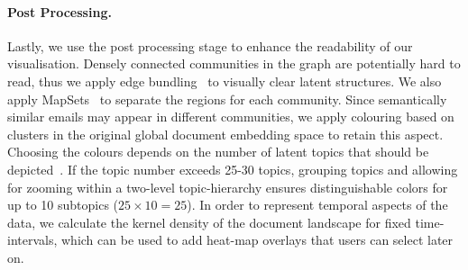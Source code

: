 \paragraph{Post Processing.}
Lastly, we use the post processing stage to enhance the readability of our visualisation.
Densely connected communities in the graph are potentially hard to read, thus we apply edge bundling~\cite{bach2017towards} to visually clear latent structures.
We also apply MapSets~\cite{efrat2015mapsets} to separate the regions for each community.
Since semantically similar emails may appear in different communities, we apply colouring based on clusters in the original global document embedding space to retain this aspect.
Choosing the colours depends on the number of latent topics that should be depicted~\cite{zeileis2009escaping}.
If the topic number exceeds 25-30 topics, grouping topics and allowing for zooming within a two-level topic-hierarchy ensures distinguishable colors for up to 10 subtopics ($25 \times 10=25$).
In order to represent temporal aspects of the data, we calculate the kernel density of the document landscape for fixed time-intervals, which can be used to add heat-map overlays that users can select later on. 


%

